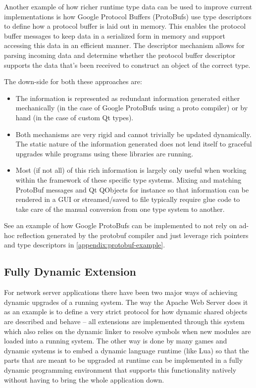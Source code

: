 \documentclass[10pt,a4paper]{article}
\begin{document}
Another example of how richer runtime type data can be used to improve current
implementations is how Google Protocol Buffers (ProtoBufs) use type descriptors
to define how a protocol buffer is laid out in memory. This enables the protocol
buffer messages to keep data in a serialized form in memory and support
accessing this data in an efficient manner. The descriptor mechanism allows for
parsing incoming data and determine whether the protocol buffer descriptor
supports the data that’s been received to construct an object of the correct
type.

The down-side for both these approaches are:

\begin{itemize}
\item The information is represented as redundant information generated either
mechanically (in the case of Google ProtoBufs using a proto compiler) or by hand
(in the case of custom Qt types).

\item Both mechanisms are very rigid and cannot trivially be updated
dynamically. The static nature of the information generated does not lend itself
to graceful upgrades while programs using these libraries are running.

\item Most (if not all) of this rich information is largely only useful when
working within the framework of these specific type systems. Mixing and matching
ProtoBuf messages and Qt QObjects for instance so that information can be
rendered in a GUI or streamed/saved to file typically require glue code to take
care of the manual conversion from one type system to another.
\end{itemize}

See an example of how Google ProtoBufs can be implemented to not rely on ad-hoc
reflection generated by the protobuf compiler and just leverage rich pointers
and type descriptors in \autoref{appendix:protobuf-example}.

\subsection{Fully Dynamic Extension}

For network server applications there have been two major ways of achieving
dynamic upgrades of a running system. The way the Apache Web Server does it as
an example is to define a very strict protocol for how dynamic shared objects
are described and behave -- all extensions are implemented through this system
which also relies on the dynamic linker to resolve symbols when new modules are
loaded into a running system. The other way is done by many games and dynamic
systems is to embed a dynamic language runtime (like Lua) so that the parts that
are meant to be upgraded at runtime can be implemented in a fully dynamic
programming environment that supports this functionality natively without having
to bring the whole application down.
\end{document}
